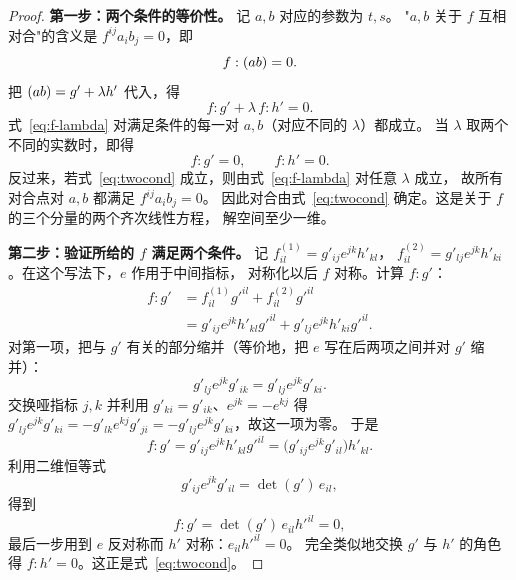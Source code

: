 \begin{proof}
\textbf{第一步：两个条件的等价性。} 记 $a,b$ 对应的参数为 $t,s$。
"$a,b$ 关于 $f$ 互相对合"的含义是 $f^{ij}a_ib_j=0$，即
\[
f:(ab)=0 .
\]
把 $(ab)=g'+\lambda h'$ 代入，得
\begin{equation}\label{eq:f-lambda}
f:g'+\lambda\,f:h'=0 .
\end{equation}
式~\eqref{eq:f-lambda} 对满足条件的每一对 $a,b$（对应不同的 $\lambda$）都成立。
当 $\lambda$ 取两个不同的实数时，即得
\begin{equation}\label{eq:twocond}
f:g'=0,\qquad f:h'=0 .
\end{equation}
反过来，若式~\eqref{eq:twocond} 成立，则由式~\eqref{eq:f-lambda} 对任意 $\lambda$ 成立，
故所有对合点对 $a,b$ 都满足 $f^{ij}a_ib_j=0$。
因此对合由式~\eqref{eq:twocond} 确定。这是关于 $f$ 的三个分量的两个齐次线性方程，
解空间至少一维。

\textbf{第二步：验证所给的 $f$ 满足两个条件。} 记 $f^{(1)}_{il}=g'_{ij}e^{jk}h'_{kl}$，
$f^{(2)}_{il}=g'_{lj}e^{jk}h'_{ki}$。在这个写法下，$e$ 作用于中间指标，
对称化以后 $f$ 对称。计算 $f:g'$：
\begin{align*}
f:g'
&=f^{(1)}_{il}g'^{il}+f^{(2)}_{il}g'^{il}\\
&=g'_{ij}e^{jk}h'_{kl}g'^{il}+g'_{lj}e^{jk}h'_{ki}g'^{il} .
\end{align*}
对第一项，把与 $g'$ 有关的部分缩并（等价地，把 $e$ 写在后两项之间并对 $g'$ 缩并）：
\[
g'_{lj}e^{jk}g'_{ik}=g'_{lj}e^{jk}g'_{ki}.
\]
交换哑指标 $j,k$ 并利用 $g'_{ki}=g'_{ik}$、$e^{jk}=-e^{kj}$ 得
$g'_{lj}e^{jk}g'_{ki}=-g'_{lk}e^{kj}g'_{ji}=-g'_{lj}e^{jk}g'_{ki}$，故这一项为零。
于是
\[
f:g'=g'_{ij}e^{jk}h'_{kl}g'^{il}
=\bigl(g'_{ij}e^{jk}g'_{il}\bigr)h'_{kl}.
\]
利用二维恒等式
\[
g'_{ij}e^{jk}g'_{il}=\det(g')\,e_{il},
\]
得到
\[
f:g'=\det(g')\,e_{il}h'^{il}=0 ,
\]
最后一步用到 $e$ 反对称而 $h'$ 对称：$e_{il}h'^{il}=0$。
完全类似地交换 $g'$ 与 $h'$ 的角色得 $f:h'=0$。这正是式~\eqref{eq:twocond}。


\end{proof}
